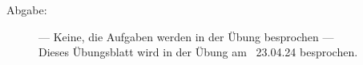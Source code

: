 \documentclass[a4paper,11pt]{scrartcl}
\begin{document}

\begin{description}
\item[Abgabe:] --- Keine, die Aufgaben werden in der Übung besprochen ---\\
Dieses Übungsblatt wird in der Übung am ~23.04.24 besprochen.


\end{description}
\end{document}
